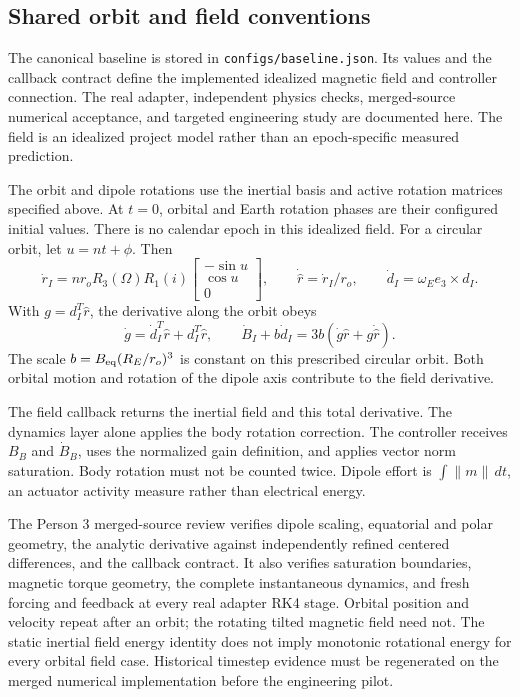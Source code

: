 \subsection{Shared orbit and field conventions}
The canonical baseline is stored in \texttt{configs/baseline.json}. Its values and the callback contract define the implemented idealized magnetic field and controller connection. The real adapter, independent physics checks, merged-source numerical acceptance, and targeted engineering study are documented here. The field is an idealized project model rather than an epoch-specific measured prediction.

The orbit and dipole rotations use the inertial basis and active rotation matrices specified above. At \(t=0\), orbital and Earth rotation phases are their configured initial values. There is no calendar epoch in this idealized field. For a circular orbit, let \(u=nt+\phi\). Then
\[
\dot r_I=nr_oR_3(\Omega)R_1(i)
\begin{bmatrix}
-\sin u\\ \cos u\\ 0
\end{bmatrix},
\qquad
\dot{\hat r}=\dot r_I/r_o,
\qquad
\dot d_I=\omega_E e_3\times d_I.
\]
With \(g=d_I^T\hat r\), the derivative along the orbit obeys
\[
\dot g=\dot d_I^T\hat r+d_I^T\dot{\hat r},
\qquad
\dot B_I+b\dot d_I=3b(\dot g\hat r+g\dot{\hat r}).
\]
The scale \(b=B_{\rm eq}(R_E/r_o)^3\) is constant on this prescribed circular orbit. Both orbital motion and rotation of the dipole axis contribute to the field derivative.

The field callback returns the inertial field and this total derivative. The dynamics layer alone applies the body rotation correction. The controller receives \(B_B\) and \(\dot B_B\), uses the normalized gain definition, and applies vector norm saturation. Body rotation must not be counted twice. Dipole effort is \(\int\|m\|\,dt\), an actuator activity measure rather than electrical energy.

The Person 3 merged-source review verifies dipole scaling, equatorial and polar geometry, the analytic derivative against independently refined centered differences, and the callback contract. It also verifies saturation boundaries, magnetic torque geometry, the complete instantaneous dynamics, and fresh forcing and feedback at every real adapter RK4 stage. Orbital position and velocity repeat after an orbit; the rotating tilted magnetic field need not. The static inertial field energy identity does not imply monotonic rotational energy for every orbital field case. Historical timestep evidence must be regenerated on the merged numerical implementation before the engineering pilot.
